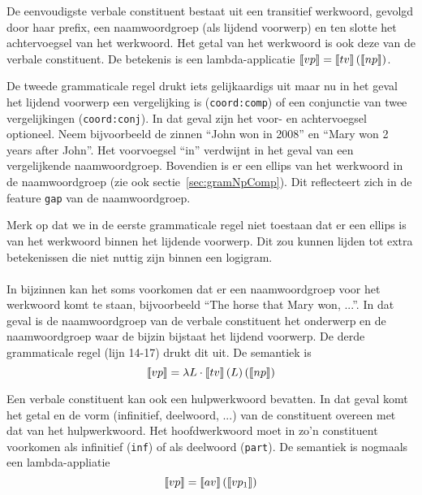 De eenvoudigste verbale constituent bestaat uit een transitief werkwoord, gevolgd door haar prefix, een naamwoordgroep (als lijdend voorwerp) en ten slotte het achtervoegsel van het werkwoord. Het getal van het werkwoord is ook deze van de verbale constituent. De betekenis is een lambda-applicatie $\llbracket vp\rrbracket = \llbracket tv\rrbracket \left( {\llbracket np\rrbracket} \right)$.

De tweede grammaticale regel drukt iets gelijkaardigs uit maar nu in het geval het lijdend voorwerp een vergelijking is (\texttt{coord:comp}) of een conjunctie van twee vergelijkingen (\texttt{coord:conj}). In dat geval zijn het voor- en achtervoegsel optioneel. Neem bijvoorbeeld de zinnen ``John won in 2008'' en ``Mary won 2 years after John''. Het voorvoegsel ``in'' verdwijnt in het geval van een vergelijkende naamwoordgroep. Bovendien is er een ellips van het werkwoord in de naamwoordgroep (zie ook sectie~\ref{sec:gramNpComp}). Dit reflecteert zich in de feature \texttt{gap} van de naamwoordgroep. 

Merk op dat we in de eerste grammaticale regel niet toestaan dat er een ellips is van het werkwoord binnen het lijdende voorwerp. Dit zou kunnen lijden tot extra betekenissen die niet nuttig zijn binnen een logigram.

\paragraph{} In bijzinnen kan het soms voorkomen dat er een naamwoordgroep voor het werkwoord komt te staan, bijvoorbeeld ``The horse that Mary won, ...''. In dat geval is de naamwoordgroep van de verbale constituent het onderwerp en de naamwoordgroep waar de bijzin bijstaat het lijdend voorwerp. De derde grammaticale regel (lijn 14-17) drukt dit uit. De semantiek is $$\llbracket vp\rrbracket = \lambda L \cdot \llbracket tv\rrbracket \left( L \right) \left( \llbracket np\rrbracket \right)$$

Een verbale constituent kan ook een hulpwerkwoord bevatten. In dat geval komt het getal en de vorm (infinitief, deelwoord, ...) van de constituent overeen met dat van het hulpwerkwoord. Het hoofdwerkwoord moet in zo'n constituent voorkomen als infinitief (\texttt{inf}) of als deelwoord (\texttt{part}). De semantiek is nogmaals een lambda-appliatie $$\llbracket vp\rrbracket = \llbracket av\rrbracket \left( \llbracket vp_1\rrbracket \right)$$


